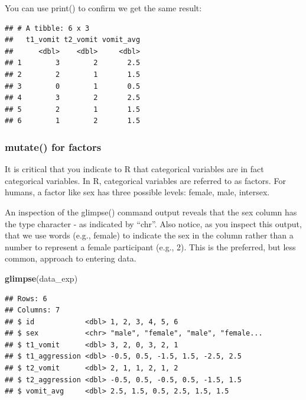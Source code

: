 \documentclass[
]{krantz}
\makeatletter
\newenvironment{Shaded}{\begin{snugshade}}{\end{snugshade}}
\newcommand{\KeywordTok}[1]{\textcolor[rgb]{0.27,0.27,0.27}{\textbf{#1}}}
\newcommand{\NormalTok}[1]{#1}
\newcommand{\OperatorTok}[1]{\textcolor[rgb]{0.43,0.43,0.43}{\textbf{#1}}}
\newcommand{\StringTok}[1]{\textcolor[rgb]{0.5,0.5,0.5}{#1}}
\newenvironment{kframe}{%
\medskip{}
\setlength{\fboxsep}{.8em}
 \def\at@end@of@kframe{}%
 \ifinner\ifhmode%
  \def\at@end@of@kframe{\end{minipage}}%
  \begin{minipage}{\columnwidth}%
 \fi\fi%
 \def\FrameCommand##1{\hskip\@totalleftmargin \hskip-\fboxsep
 \colorbox{shadecolor}{##1}\hskip-\fboxsep
     \hskip-\linewidth \hskip-\@totalleftmargin \hskip\columnwidth}%
 \MakeFramed {\advance\hsize-\width
   \@totalleftmargin\z@ \linewidth\hsize
   \@setminipage}}%
 {\par\unskip\endMakeFramed%
 \at@end@of@kframe}
\renewenvironment{Shaded}{\begin{kframe}}{\end{kframe}}
\makeatother
\begin{document}
You can use print() to confirm we get the same result:

\begin{Shaded}
\end{Shaded}

\begin{verbatim}
## # A tibble: 6 x 3
##   t1_vomit t2_vomit vomit_avg
##      <dbl>    <dbl>     <dbl>
## 1        3        2       2.5
## 2        2        1       1.5
## 3        0        1       0.5
## 4        3        2       2.5
## 5        2        1       1.5
## 6        1        2       1.5
\end{verbatim}

\hypertarget{mutate-for-factors}{%
\subsubsection{mutate() for factors}\label{mutate-for-factors}}

It is critical that you indicate to R that categorical variables are in fact categorical variables. In R, categorical variables are referred to as factors. For humans, a factor like sex has three possible levels: female, male, intersex.

An inspection of the glimpse() command output reveals that the sex column has the type character - as indicated by ``chr''. Also notice, as you inspect this output, that we use words (e.g., female) to indicate the sex in the column rather than a number to represent a female participant (e.g., 2). This is the preferred, but less common, approach to entering data.

\begin{Shaded}
\begin{Highlighting}[]
\KeywordTok{glimpse}\NormalTok{(data_exp)}
\end{Highlighting}
\end{Shaded}

\begin{verbatim}
## Rows: 6
## Columns: 7
## $ id            <dbl> 1, 2, 3, 4, 5, 6
## $ sex           <chr> "male", "female", "male", "female...
## $ t1_vomit      <dbl> 3, 2, 0, 3, 2, 1
## $ t1_aggression <dbl> -0.5, 0.5, -1.5, 1.5, -2.5, 2.5
## $ t2_vomit      <dbl> 2, 1, 1, 2, 1, 2
## $ t2_aggression <dbl> -0.5, 0.5, -0.5, 0.5, -1.5, 1.5
## $ vomit_avg     <dbl> 2.5, 1.5, 0.5, 2.5, 1.5, 1.5
\end{verbatim}
\end{document}
